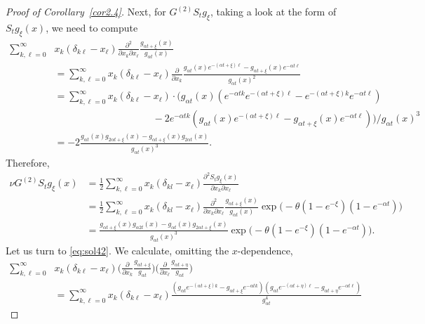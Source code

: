 \documentclass[10pt,a4paper]{amsart}
\begin{document}
\begin{proof}[Proof of Corollary~\ref{cor2.4}]
Next, for $G^{(2)}S_t g_{\xi}$, taking a look at the form of $S_tg_{\xi}(x)$, we need to compute
\begin{align*}
  \sum_{k,\ell=0}^\infty & 
  x_k(\delta_{k\ell} - x_\ell) \frac{\partial^2}{\partial x_k
    \partial x_\ell} \frac{g_{\alpha t + \xi}(x)}{g_{\alpha t}(x)} 
  \\
  & = \sum_{k,\ell=0}^\infty
  x_k(\delta_{k\ell} - x_\ell) \frac{\partial}{\partial x_k} \frac{g_{\alpha t}(x) e^{-(\alpha t + \xi)\ell} - g_{\alpha t + \xi}(x) e^{-\alpha t \ell}}{g_{\alpha t}(x)^2} 
  \\ & = \sum_{k,\ell=0}^\infty
  x_k(\delta_{k\ell} - x_\ell) \cdot \big(g_{\alpha t}(x) ( e^{-\alpha t k} e^{-(\alpha t + \xi)\ell} - e^{-(\alpha t + \xi) k} e^{-\alpha t \ell}) \\ & \qquad \qquad \qquad \qquad \qquad - 2 e^{-\alpha tk}(g_{\alpha t}(x) e^{-(\alpha t + \xi)\ell} - g_{\alpha t + \xi}(x) e^{-\alpha t \ell})\big) / g_{\alpha t}(x)^3
  \\ & =  
  -2\frac{g_{\alpha t}(x)g_{2\alpha t+\xi}(x) - g_{\alpha t +\xi}(x)g_{2\alpha t}(x)}{g_{\alpha t}(x)^3}.
\end{align*}
Therefore, 
\begin{align*}
    \nu G^{(2)} S_{t} g_{ \xi}(x) & = \frac{1}{2} \sum_{k,\ell = 0}^\infty x_k ( \delta_{kl} - x_\ell) \frac{\partial^2 S_{t} g_{ \xi} (x)}{\partial x_k \partial x_\ell} \\ & = 
    \frac{1}{2} \sum_{k,\ell = 0}^\infty x_k ( \delta_{kl} - x_\ell) \frac{\partial^2 }{\partial x_k \partial x_\ell} \frac{g_{\alpha t +\xi}(x)}{g_{\alpha t}(x)}
    \exp\Big(-\theta(1-e^{-\xi})(1-e^{-\alpha t})\Big) \\ & = 
    \frac{g_{\alpha t + \xi}(x)g_{\alpha 2t}(x) - g_{\alpha t}(x) g_{2\alpha t+\xi}(x)}{g_{\alpha t}(x)^3}\exp\Big(-\theta(1-e^{- \xi})(1-e^{-\alpha t})\Big).
\end{align*}
Let us turn to \eqref{eq:sol42}. We calculate, omitting the $x$-dependence,
\begin{align*}
  \sum_{k,\ell=0}^\infty & 
  x_k(\delta_{k\ell} - x_\ell) \Big(\frac{\partial}{\partial x_k}\frac{g_{\alpha  t + \xi}}{g_{\alpha t}} \Big) \Big(\frac{\partial}{\partial x_\ell} \frac{g_{\alpha t + \eta}}{g_{\alpha t}}\Big)
  \\
  & = \sum_{k,\ell=0}^\infty
  x_k(\delta_{k\ell} - x_\ell) \frac{(g_{\alpha t} e^{-(\alpha t + \xi)k} - g_{\alpha t + \xi} e^{-\alpha t k})(g_{\alpha t} e^{-(\alpha t + \eta)\ell} - g_{\alpha t + \eta} e^{-\alpha t \ell})}{g_{\alpha t}^4} 

\end{align*}
\end{proof}
\end{document}
